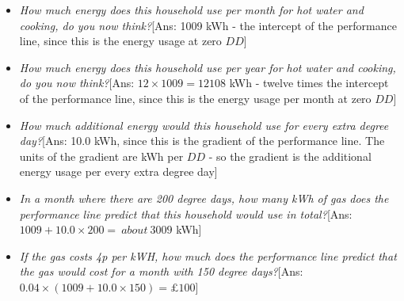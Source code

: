 \documentclass{article}
\begin{document}
\begin{itemize}
\item \textit{How much energy does this household use per month for hot water and cooking, do you now think?}[Ans: 1009 kWh - the intercept of the performance line, since this is the energy usage at zero $DD$]

\item \textit{How much energy does this household use per year for hot water and cooking, do you now think?}[Ans: $12 \times 1009=12108$ kWh - twelve times the intercept of the performance line, since this is the energy usage per month at zero $DD$]

\item \textit{How much additional energy would this household use for every extra degree day?}[Ans: 10.0 kWh, since this is the gradient of the performance line. The units of the gradient are kWh per $DD$ - so the gradient is the additional energy usage per every extra degree day]

\item \textit{In a month where there are 200 degree days, how many kWh of gas does the performance line predict that this household would use in total?}[Ans: $1009 + 10.0 \times 200 =\ about\ 3009$ kWh]

\item \textit{If the gas costs 4p per kWH, how much does the performance line predict that the gas would cost for a month with 150 degree days?}[Ans: $0.04 \times (1009 + 10.0 \times 150) =  \pounds 100$]
\end{itemize}
\end{document}
